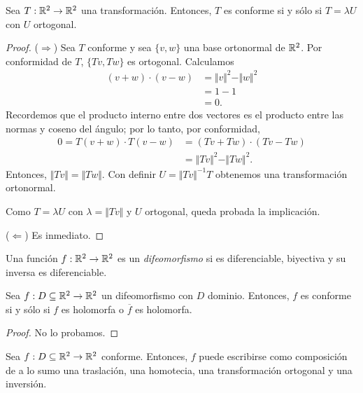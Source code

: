 \begin{proposition}
    Sea $T: \mathbb{R}^2 \to \mathbb{R}^2$ una transformación. Entonces, $T$ es conforme si y sólo si $T = \lambda U$ con $U$ ortogonal.
\end{proposition}

\begin{proof}
    ($\Rightarrow$) Sea $T$ conforme y sea $\{v, w\}$ una base ortonormal de $\mathbb{R}^2$. Por conformidad de $T$, $\{Tv, Tw\}$ es ortogonal. Calculamos
    \begin{align*}
        (v + w) \cdot (v - w) &= \Vert v \Vert^2 - \Vert w \Vert^2 \\
        &= 1 - 1 \\
        &= 0.
    \end{align*}
    Recordemos que el producto interno entre dos vectores es el producto entre las normas y coseno del ángulo; por lo tanto, por conformidad, 
    \begin{align*}
        0 = T(v + w) \cdot T(v - w) &= (Tv + Tw) \cdot (Tv - Tw) \\
        &= \Vert Tv \Vert^2 - \Vert Tw \Vert^2.
    \end{align*}
    Entonces, $\Vert Tv \Vert = \Vert Tw \Vert$. Con definir $U = \Vert Tv \Vert^{-1} T$ obtenemos una transformación ortonormal.

    Como $T = \lambda U$ con $\lambda = \Vert Tv \Vert$ y $U$ ortogonal, queda probada la implicación.

    ($\Leftarrow$) Es inmediato.
\end{proof}

Una función $f: \mathbb{R}^2 \to \mathbb{R}^2$ es un \emph{difeomorfismo} si es diferenciable, biyectiva y su inversa es diferenciable.

\begin{proposition}
    Sea $f: D \subseteq \mathbb{R}^2 \to \mathbb{R}^2$ un difeomorfismo con $D$ dominio. Entonces, $f$ es conforme si y sólo si $f$ es holomorfa o $\overline{f}$ es holomorfa.
\end{proposition}

\begin{proof}
    No lo probamos.
\end{proof}

\begin{theorem}
    Sea $f: D \subseteq \mathbb{R}^2 \to \mathbb{R}^2$ conforme. Entonces, $f$ puede escribirse como composición de a lo sumo una traslación, una homotecia, una transformación ortogonal
    y una inversión.
\end{theorem}


